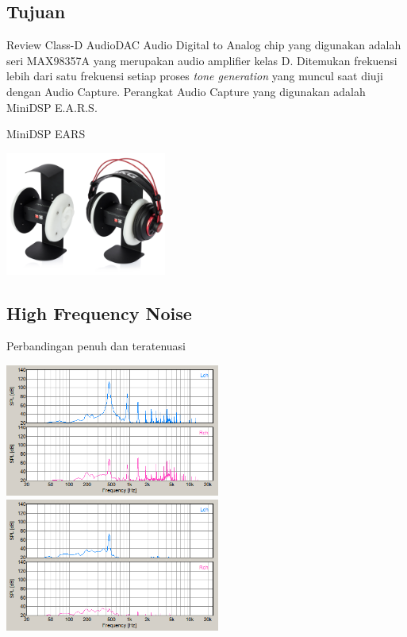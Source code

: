 \documentclass[table,dvipsnames]{beamer}
\begin{document}
	\begin{frame}
		\subsection{Tujuan}
		\begin{exampleblock}{Review Class-D AudioDAC}
			Audio Digital to Analog chip yang digunakan adalah seri MAX98357A yang merupakan audio amplifier kelas D.
			Ditemukan frekuensi lebih dari satu frekuensi setiap proses \textit{tone generation} yang muncul saat diuji dengan Audio Capture.
			Perangkat Audio Capture yang digunakan adalah MiniDSP E.A.R.S.
		\end{exampleblock}
	
		\begin{exampleblock}{MiniDSP EARS}
			\begin{center}
				\includegraphics[width=150pt]{images/ears}
			\end{center}
		\end{exampleblock}
	\end{frame}

	\begin{frame}
		\subsection{High Frequency Noise}
		\begin{exampleblock}{Perbandingan penuh dan teratenuasi}
			\begin{center}
				\includegraphics[width=200pt]{images/notattenuated}
				\includegraphics[width=200pt]{images/attenuated}
			\end{center}
		\end{exampleblock}
	\end{frame}
	
\end{document}

